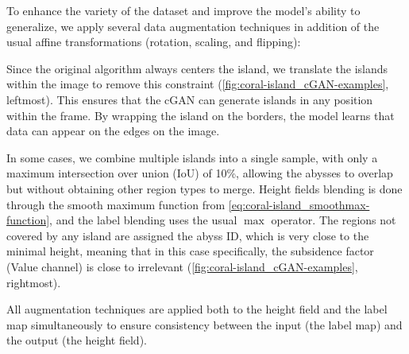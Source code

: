 To enhance the variety of the dataset and improve the model's ability to generalize, we apply several data augmentation techniques in addition of the usual affine transformations (rotation, scaling, and flipping):
\begin{Itemize}
         Since the original algorithm always centers the island, we translate the islands within the image to remove this constraint (\cref{fig:coral-island_cGAN-examples}, leftmost). This ensures that the cGAN can generate islands in any position within the frame. By wrapping the island on the borders, the model learns that data can appear on the edges on the image.


         In some cases, we combine multiple islands into a single sample, with only a maximum intersection over union (IoU) of 10\%, allowing the abysses to overlap but without obtaining other region types to merge. Height fields blending is done through the smooth maximum function from \cref{eq:coral-island_smoothmax-function}, and the label blending uses the usual $\max$ operator. The regions not covered by any island are assigned the abyss ID, which is very close to the minimal height, meaning that in this case specifically, the subsidence factor (Value channel) is close to irrelevant (\cref{fig:coral-island_cGAN-examples}, rightmost). 
\end{Itemize}

All augmentation techniques are applied both to the height field and the label map simultaneously to ensure consistency between the input (the label map) and the output (the height field).